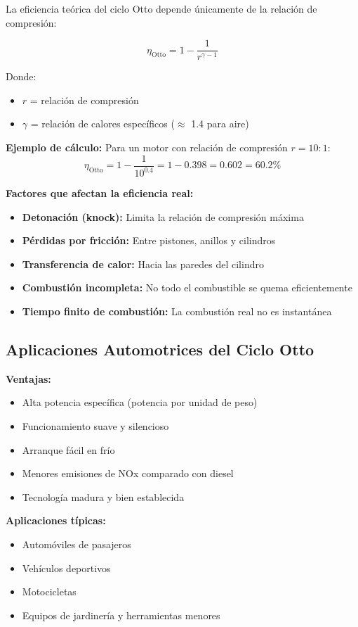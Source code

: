 \documentclass{article}
\begin{document}
La eficiencia teórica del ciclo Otto depende únicamente de la relación de compresión:

$$\eta_{\text{Otto}} = 1 - \frac{1}{r^{\gamma-1}}$$

Donde:
\begin{itemize}
    \item $r$ = relación de compresión
    \item $\gamma$ = relación de calores específicos ($\approx$ 1.4 para aire)
\end{itemize}

\textbf{Ejemplo de cálculo:}
Para un motor con relación de compresión $r = 10:1$:
$$\eta_{\text{Otto}} = 1 - \frac{1}{10^{0.4}} = 1 - 0.398 = 0.602 = 60.2\%$$

\textbf{Factores que afectan la eficiencia real:}
\begin{itemize}
    \item \textbf{Detonación (knock):} Limita la relación de compresión máxima
    \item \textbf{Pérdidas por fricción:} Entre pistones, anillos y cilindros
    \item \textbf{Transferencia de calor:} Hacia las paredes del cilindro
    \item \textbf{Combustión incompleta:} No todo el combustible se quema eficientemente
    \item \textbf{Tiempo finito de combustión:} La combustión real no es instantánea
\end{itemize}

\subsection*{Aplicaciones Automotrices del Ciclo Otto}

\textbf{Ventajas:}
\begin{itemize}
    \item Alta potencia específica (potencia por unidad de peso)
    \item Funcionamiento suave y silencioso
    \item Arranque fácil en frío
    \item Menores emisiones de NOx comparado con diesel
    \item Tecnología madura y bien establecida
\end{itemize}

\textbf{Aplicaciones típicas:}
\begin{itemize}
    \item Automóviles de pasajeros
    \item Vehículos deportivos
    \item Motocicletas
    \item Equipos de jardinería y herramientas menores
\end{itemize}
\end{document}
